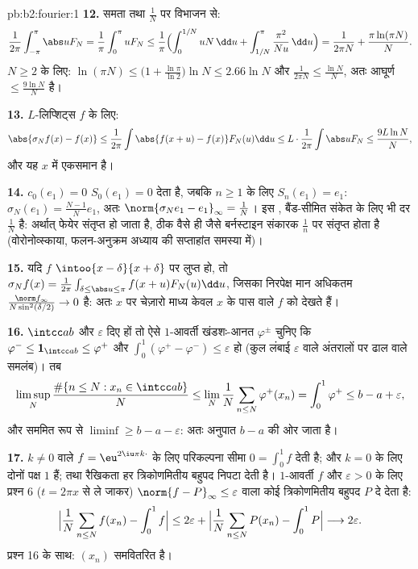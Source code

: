 \begin{solution}{pb:b2:fourier:1}
\textbf{12.} समता तथा $\frac1N$ पर विभाजन से:
\[
\frac{1}{2\pi}\int_{-\pi}^{\pi}\abs uF_N
= \frac1\pi\int_0^\pi uF_N
\leq \frac1\pi\Bigl(\int_0^{1/N}uN\,\dd u +
\int_{1/N}^{\pi}\frac{\pi^2}{Nu}\,\dd u\Bigr)
= \frac{1}{2\pi N} + \frac{\pi\ln(\pi N)}{N} .
\]
$N \geq 2$ के लिए: $\ln(\pi N) \leq \bigl(1 +
\frac{\ln\pi}{\ln2}\bigr)\ln N \leq 2.66\ln N$ और $\frac{1}{2\pi N} \leq \frac{\ln N}{N}$, अतः आघूर्ण $\leq \frac{9\ln N}{N}$ है।

\textbf{13.} $L$-लिप्शिट्स $f$ के लिए:
\[
\abs{\sigma_Nf(x) - f(x)}
\leq \frac{1}{2\pi}\int\abs{f(x+u) - f(x)}F_N(u)\dd u
\leq L\cdot\frac{1}{2\pi}\int\abs uF_N
\leq \frac{9L\ln N}{N},
\]
और यह $x$ में एकसमान है।

\textbf{14.} $c_0(e_1) = 0$ $S_0(e_1) = 0$ देता है, जबकि $n \geq 1$ के लिए $S_n(e_1) = e_1$: $\sigma_N(e_1) =
\frac{N-1}{N}e_1$, अतः $\norm{\sigma_Ne_1 - e_1}_\infty =
\frac1N$। इस
, बैंड-सीमित संकेत के लिए भी दर $\frac1N$ है: अर्थात् फेयेर संतृप्त हो
जाता है, ठीक वैसे ही जैसे बर्नस्टाइन संकारक $\frac1n$ पर संतृप्त होता है
(वोरोनोव्स्काया, फलन-अनुक्रम अध्याय की सप्ताहांत समस्या में)।

\textbf{15.} यदि $f$ $\intoo{x-\delta}{x+\delta}$ पर लुप्त हो, तो $\sigma_Nf(x) = \frac{1}{2\pi}\int_{\delta \leq \abs u
\leq \pi}f(x+u)F_N(u)\dd u$, जिसका निरपेक्ष मान अधिकतम
$\frac{\norm f_\infty}{N\sin^2(\delta/2)} \to 0$ है: अतः $x$ पर चेज़ारो माध्य केवल $x$ के पास वाले $f$ को देखते हैं।

\textbf{16.} $\intcc ab$ और $\varepsilon$ दिए हों तो ऐसे  $1$-आवर्ती खंडशः-आनत $\varphi^\pm$
चुनिए कि $\varphi^- \leq \mathbf 1_{\intcc ab} \leq \varphi^+$ और $\int_0^1(\varphi^+ - \varphi^-) \leq \varepsilon$ हो (कुल लंबाई $\varepsilon$ वाले अंतरालों पर ढाल वाले समलंब)।
तब
\[
\limsup_N\frac{\#\{n \leq N : x_n \in \intcc ab\}}{N}
\leq \lim_N\frac1N\sum_{n\leq N}\varphi^+(x_n)
= \int_0^1\varphi^+ \leq b - a + \varepsilon ,
\]
और सममित रूप से $\liminf \geq b - a - \varepsilon$: अतः अनुपात $b - a$ की ओर जाता है।

\textbf{17.} $k \neq 0$ वाले $f = \eu^{2\iu\pi k\cdot}$ के लिए परिकल्पना सीमा $0 = \int_0^1f$ देती है; और $k = 0$ के
लिए दोनों पक्ष $1$ हैं; तथा रैखिकता हर त्रिकोणमितीय बहुपद निपटा देती है।
 $1$-आवर्ती $f$ और $\varepsilon >
0$ के लिए प्रश्न 6 ($t = 2\pi x$ से ले जाकर) $\norm{f - P}_\infty \leq
\varepsilon$ वाला कोई
त्रिकोणमितीय बहुपद $P$ दे देता है:
\[
\Bigl|\frac1N\sum_{n\leq N}f(x_n) - \int_0^1f\Bigr|
\leq 2\varepsilon +
\Bigl|\frac1N\sum_{n\leq N}P(x_n) - \int_0^1P\Bigr|
\longrightarrow 2\varepsilon .
\]
प्रश्न 16 के साथ: $(x_n)$ समवितरित है।


\end{solution}
